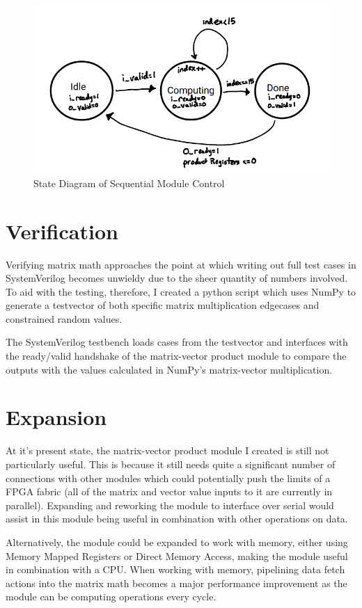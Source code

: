 \documentclass{article}
\begin{document}
\begin{figure}
    \centering  %
    \includegraphics[width = .8\textwidth]{Handshake_State_Diagram.png}
    \caption{State Diagram of Sequential Module Control}
    \label{fig:state_diag}
\end{figure}

\section{Verification}

Verifying matrix math approaches the point at which writing out full test cases in SystemVerilog becomes unwieldy due to the sheer quantity of numbers involved. To aid with the testing, therefore, I created a python script which uses NumPy to generate a testvector of both specific matrix multiplication edgecases and constrained random values.

The SystemVerilog testbench loads cases from the testvector and interfaces with the ready/valid handshake of the matrix-vector product module to compare the outputs with the values calculated in NumPy's matrix-vector multiplication.

\section{Expansion}
At it's present state, the matrix-vector product module I created is still not particularly useful. This is because it still needs quite a significant number of connections with other modules which could potentially push the limits of a FPGA fabric (all of the matrix and vector value inputs to it are currently in parallel). Expanding and reworking the module to interface over serial would assist in this module being useful in combination with other operations on data.

Alternatively, the module could be expanded to work with memory, either using Memory Mapped Registers or Direct Memory Access, making the module useful in combination with a CPU. When working with memory, pipelining data fetch actions into the matrix math becomes a major performance improvement as the module can be computing operations every cycle.
\end{document}

